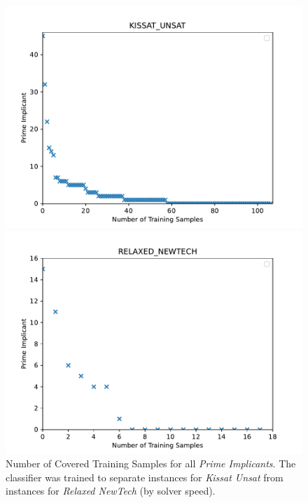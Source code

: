 \documentclass[a4paper, USenglish, cleveref, autoref, thm-restate]{lipics-v2021}
\theoremstyle{definition}
\begin{document}
\begin{figure}
\begin{minipage}{.49\linewidth}
\includegraphics[width=\linewidth]{fig/random-forest-2-kissat-unsat.pdf}
\end{minipage}
\begin{minipage}{.49\linewidth}
\includegraphics[width=\linewidth]{fig/random-forest-2-relaxed-newtech.pdf}
\end{minipage}
\caption{Number of Covered Training Samples for all \emph{Prime Implicants}. The classifier was trained to separate instances for \emph{Kissat Unsat} from instances for \emph{Relaxed NewTech} (by solver speed).}
\label{fig:eval:portfolio-rf}
\end{figure}
\end{document}
